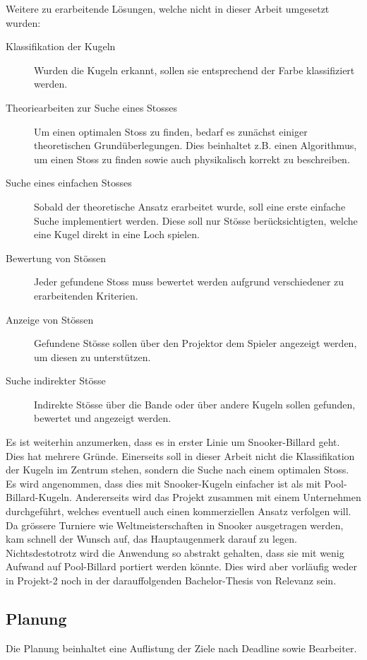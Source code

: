Weitere zu erarbeitende Lösungen, welche nicht in dieser Arbeit umgesetzt wurden:
\begin{description}
    \item[Klassifikation der Kugeln] Wurden die Kugeln erkannt, sollen sie entsprechend der Farbe klassifiziert werden.
    \item[Theoriearbeiten zur Suche eines Stosses] Um einen optimalen Stoss zu finden, bedarf es zunächst einiger
    theoretischen Grundüberlegungen. Dies beinhaltet z.B. einen Algorithmus, um einen Stoss zu finden sowie auch
    physikalisch korrekt zu beschreiben.
    \item[Suche eines einfachen Stosses] Sobald der theoretische Ansatz erarbeitet wurde, soll eine erste einfache
    Suche implementiert werden. Diese soll nur Stösse berücksichtigten, welche eine Kugel direkt in eine Loch spielen.
    \item[Bewertung von Stössen] Jeder gefundene Stoss muss bewertet werden aufgrund verschiedener zu erarbeitenden Kriterien.
    \item[Anzeige von Stössen] Gefundene Stösse sollen über den Projektor dem Spieler angezeigt werden, um diesen
    zu unterstützen.
    \item[Suche indirekter Stösse] Indirekte Stösse über die Bande oder über andere Kugeln sollen gefunden, bewertet und angezeigt werden.
\end{description}

Es ist weiterhin anzumerken, dass es in erster Linie um Snooker-Billard geht. Dies hat mehrere Gründe. Einerseits soll
in dieser Arbeit nicht die Klassifikation der Kugeln im Zentrum stehen, sondern die Suche nach einem optimalen Stoss.
Es wird angenommen, dass dies mit Snooker-Kugeln einfacher ist als mit Pool-Billard-Kugeln. Andererseits wird das
Projekt zusammen mit einem Unternehmen durchgeführt, welches eventuell auch einen kommerziellen Ansatz verfolgen
will. Da grössere Turniere wie Weltmeisterschaften in Snooker ausgetragen werden, kam schnell der Wunsch auf, das
Hauptaugenmerk darauf zu legen. Nichtsdestotrotz wird die Anwendung so abstrakt gehalten, dass sie mit wenig Aufwand
auf Pool-Billard portiert werden könnte. Dies wird aber vorläufig weder in Projekt-2 noch in der darauffolgenden
Bachelor-Thesis von Relevanz sein.

\subsection{Planung}
Die Planung beinhaltet eine Auflistung der Ziele nach Deadline sowie Bearbeiter.

